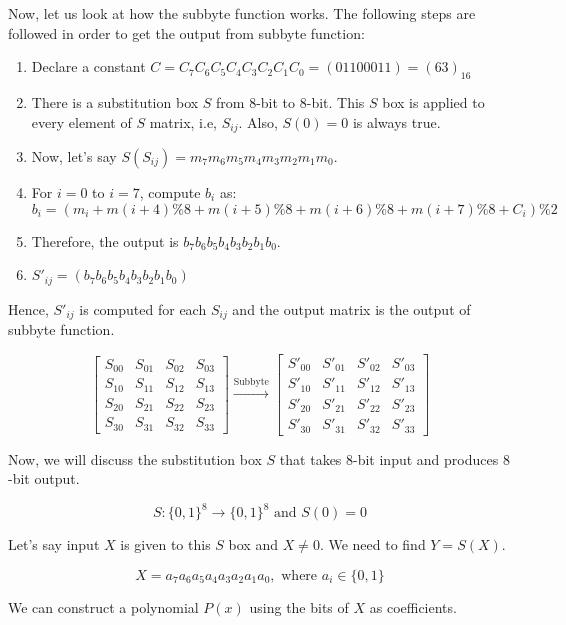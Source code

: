 \documentclass[11pt]{article}
\begin{document}
Now, let us look at how the subbyte function works. The following steps are followed in order to get the output from subbyte function:
\begin{enumerate}
    \item Declare a constant $C = C_7C_6C_5C_4C_3C_2C_1C_0 = (01100011) = (63)_{16}$
    \item There is a substitution box $S$ from $8$-bit to $8$-bit. This $S$ box is applied to every element of $S$ matrix, i.e, $S_{ij}$. Also, $S(0) = 0$ is always true.
    \item Now, let’s say $S(S_{ij}) = m_7m_6m_5m_4m_3m_2m_1m_0$.
    \item For $i = 0$ to $i = 7$, compute $b_i$ as:
    \[ b_i = (m_i + m(i+4)\%8 + m(i+5)\%8 + m(i+6)\%8 + m(i+7)\%8 + C_i)\%2 \]
    \item Therefore, the output is $b_7b_6b_5b_4b_3b_2b_1b_0$.
    \item $S'_{ij} = (b_7b_6b_5b_4b_3b_2b_1b_0)$
\end{enumerate}

Hence, $S'_{ij}$ is computed for each $S_{ij}$ and the output matrix is the output of subbyte function.

\[ \begin{bmatrix} S_{00} & S_{01} & S_{02} & S_{03} \\ S_{10} & S_{11} & S_{12} & S_{13} \\ S_{20} & S_{21} & S_{22} & S_{23} \\ S_{30} & S_{31} & S_{32} & S_{33} \end{bmatrix} \xrightarrow{\text{Subbyte}} \begin{bmatrix} S'_{00} & S'_{01} & S'_{02} & S'_{03} \\ S'_{10} & S'_{11} & S'_{12} & S'_{13} \\ S'_{20} & S'_{21} & S'_{22} & S'_{23} \\ S'_{30} & S'_{31} & S'_{32} & S'_{33} \end{bmatrix} \]

Now, we will discuss the substitution box $S$ that takes $8$-bit input and produces $8$-bit output.

\[ S : \{0, 1\}^8 \rightarrow \{0, 1\}^8 \text{ and } S(0) = 0 \]

Let’s say input $X$ is given to this $S$ box and $X \neq 0$. We need to find $Y = S(X)$.

\[ X = a_7a_6a_5a_4a_3a_2a_1a_0, \text{ where } a_i \in \{0, 1\} \]

We can construct a polynomial $P(x)$ using the bits of $X$ as coefficients.
\end{document}
